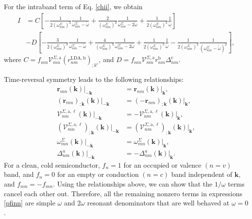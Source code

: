 For the intraband term of Eq. \eqref{chii}, we obtain
\begin{align}\label{pfinn} 
I&= 
C
\left[
-\frac{1}{2(\omega^\Sigma_{nm})^2}\frac{1}{\omega^\Sigma_{nm}-\tilde\omega}
+\frac{2}{(\omega^\Sigma_{nm})^2}\frac{1}{\omega^\Sigma_{nm}-2\tilde\omega}
+\frac{1}{2(\omega^\Sigma_{nm})^2}\frac{1}{\tilde\omega}
\right]
\nonumber\\
&-D
\left[
-\frac{3}{2(\omega^\Sigma_{nm})^3}\frac{1}{\omega^\Sigma_{nm}-\tilde\omega}
+\frac{4}{(\omega^\Sigma_{nm})^3}\frac{1}{\omega^\Sigma_{nm}-2\tilde\omega}
+\frac{1}{2(\omega^\Sigma_{nm})^3}\frac{1}{\tilde\omega}
-\frac{1}{2(\omega^\Sigma_{nm})^2}\frac{1}{(\omega^\Sigma_{nm}-\tilde\omega)^2}
\right],
\end{align} 
where $C = f_{mn}\mathcal{V}^{\Sigma,\mathrm{a}}_{mn}
(r^{\mathrm{LDA},\mathrm{b}}_{nm})_{;k^{\mathrm{c}}}$, and $D =
f_{mn}\mathcal{V}^{\Sigma,\mathrm{a}}_{mn}
r^{\mathrm{b}}_{nm}\Delta^{\mathrm{c}}_{nm}$.

Time-reversal symmetry leads to the following relationships:
\begin{equation}\label{time_reversal}
\begin{split}
   \mathbf{r}_{mn}(\mathbf{k})\vert_{-\mathbf{k}}
&= \mathbf{r}_{nm}(\mathbf{k})\vert_{\mathbf{k}},\\
   (\mathbf{r}_{mn})_{;\mathbf{k}}(\mathbf{k})\vert_{-\mathbf{k}}
&= (-\mathbf{r}_{nm})_{;\mathbf{k}}(\mathbf{k})\vert_{\mathbf{k}},\\
   \mathcal{V}^{\Sigma,\text{a},\ell}_{mn}(\mathbf{k})\vert_{-\mathbf{k}}
&= -\mathbf{\mathcal{V}}_{nm}^{\Sigma,\text{a},\ell}(\mathbf{k})
   \vert_{\mathbf{k}},\\
   (\mathcal{V}^{\Sigma,\text{a},\ell}_{mn})_{;\mathbf{k}}
   (\mathbf{k})\vert_{-\mathbf{k}}
&= (\mathbf{\mathcal{V}}_{nm}^{\Sigma,\text{a},\ell})_{;\mathbf{k}}
   (\mathbf{k})\vert_{\mathbf{k}},\\
   \omega_{mn}^{\Sigma}(\mathbf{k})\vert_{-\mathbf{k}}
&= \omega_{mn}^{\Sigma}(\mathbf{k})\vert_{\mathbf{k}},\\
   \Delta^{a}_{nm}(\mathbf{k})\vert_{-\mathbf{k}}
&= -\Delta^{a}_{nm}(\mathbf{k})\vert_{\mathbf{k}}.
\end{split}
\end{equation}
For a clean, cold semiconductor, $f_{n} = 1$ for an occupied or valence $(n =
v)$ band, and $f_{n} = 0$ for an empty or conduction $(n = c)$ band independent
of $\mathbf{k}$, and $f_{nm} = -f_{mn}$. Using the relationships above, we can
show that the $1/\omega$ terms cancel each other out. Therefore, all the
remaining nonzero terms in expressions \eqref{pfinn} are simple $\omega$ and
$2\omega$ resonant denominators that are well behaved at $\omega = 0$.

